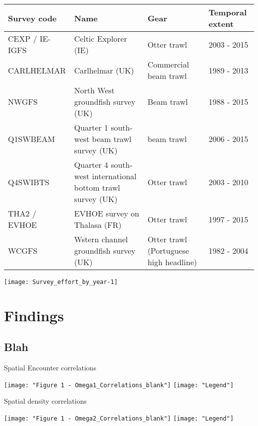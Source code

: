 \documentclass[xcolor=x11names,compress]{beamer}
\renewcommand{\(}{\begin{columns}}
\renewcommand{\)}{\end{columns}}
\newcommand{\<}[1]{\begin{column}{#1}}
\renewcommand{\>}{\end{column}}
\begin{document}
\begin{frame}

\begin{table}[!htb]
	\tiny
	\center
	\begin{tabular}{ p{1.5cm} p{3cm} p{2cm} p{1.5cm} }
		\hline
		Survey code    & Name 	& Gear & Temporal extent \\
		\hline
		CEXP / IE-IGFS & Celtic Explorer (IE)   & Otter trawl & 2003 - 2015 \\
		CARLHELMAR     & Carlhelmar (UK)	& Commercial beam trawl & 1989 - 2013 \\
		NWGFS          & North West groundfish survey (UK) & Beam trawl & 1988 - 2015 \\
		Q1SWBEAM       & Quarter 1 south-west beam trawl survey (UK) 	& beam trawl & 2006 - 2015 \\
		Q4SWIBTS       & Quarter 4 south-west international bottom trawl survey (UK) & Otter trawl & 2003 - 2010 \\
		THA2 / EVHOE    & EVHOE survey on Thalasa (FR) & Otter trawl & 1997 - 2015 \\
		WCGFS          & Wstern channel groundfish survey (UK) & Otter
		trawl (Portuguese high headline) & 1982 - 2004 \\
		\hline
	\end{tabular}
\end{table}

\centering
\texttt{[image: Survey\_effort\_by\_year-1]}

\end{frame}





\section{Findings}
\subsection{Blah}

\begin{frame}{Spatial Encounter correlations}

\centering
\texttt{[image: "Figure 1 - Omega1\_Correlations\_blank"]}
\texttt{[image: "Legend"]}

	
\end{frame}

\begin{frame}{Spatial density correlations}

\centering
\texttt{[image: "Figure 1 - Omega2\_Correlations\_blank"]}
\texttt{[image: "Legend"]}

\end{frame}
\end{document}
